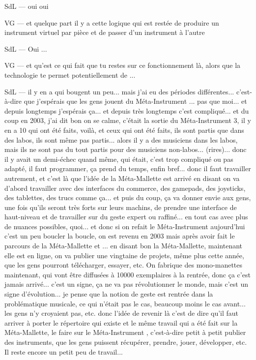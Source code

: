 SdL — oui oui 

VG — et quelque part il y a cette logique qui est restée de produire un instrument virtuel par pièce et de passer d'un instrument à l'autre 

SdL — Oui ... 

VG — et qu'est ce qui fait que tu restes sur ce fonctionnement là, alors que la technologie te permet potentiellement de ... 

SdL — il y en a qui bougent un peu... mais j'ai eu des périodes différentes... c'est-à-dire que j'espérais que les gens jouent du Méta-Instrument ... pas que moi... et depuis longtemps j'espérais ça... et depuis très longtemps c'est compliqué... et du coup en 2003, j'ai dit bon on se calme, c'était la sortie du Méta-Instrument 3, il y en a 10 qui ont été faits, voilà, et ceux qui ont été faits, ils sont partis que dans des labos, ils sont même pas partis... alors il y a des musiciens dans les labos, mais ils ne sont pas du tout partis pour des musiciens non-labos... (rires)... donc il y avait un demi-échec quand même, qui était, c'est trop compliqué ou pas adapté, il faut programmer, ça prend du temps, enfin bref... donc il faut travailler autrement, et c'est là que l'idée de la Méta-Mallette est arrivé en disant on va d'abord travailler avec des interfaces du commerce, des gamepads, des joysticks, des tablettes, des trucs comme ça... et puis du coup, ça va donner envie aux gens, une fois qu'ils seront très forts sur leurs machins, de prendre une interface de haut-niveau et de travailler sur du geste expert ou raffiné... en tout cas avec plus de nuances possibles, quoi... et donc si on refait le Méta-Instrument aujourd'hui c'est un peu boucler la boucle, on est revenu en 2003 mais après avoir fait le parcours de la Méta-Mallette et ... en disant bon la Méta-Mallette, maintenant elle est en ligne, on va publier une vingtaine de projets, même plus cette année, que les gens pourront télécharger, essayer, etc. On fabrique des mono-manettes maintenant, qui vont être diffusées à 10000 exemplaires à la rentrée, donc ça c'est jamais arrivé... c'est un signe, ça ne va pas révolutionner le monde, mais c'est un signe d'évolution... je pense que la notion de geste est rentrée dans la problématique musicale, ce qui n'était pas le cas, beaucoup moins le cas avant... les gens n'y croyaient pas, etc. donc l'idée de revenir là c'est de dire qu'il faut arriver à porter le répertoire qui existe et le même travail qui a été fait sur la Méta-Mallette, le faire sur le Méta-Instrument , c'est-à-dire petit à petit publier des instruments, que les gens puissent récupérer, prendre, jouer, développer, etc. Il reste encore un petit peu de travail... 

